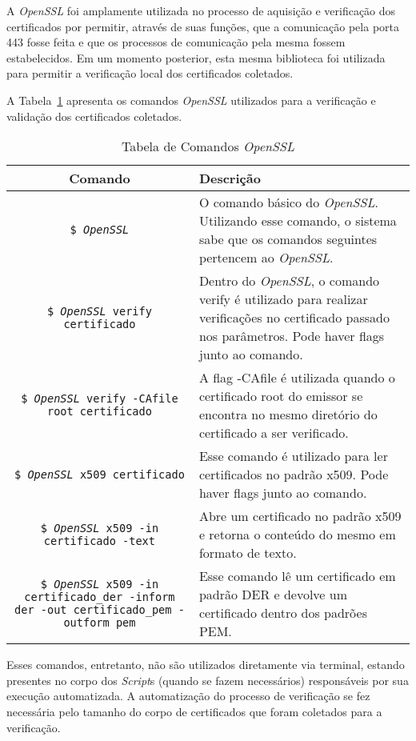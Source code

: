 		A \textit{OpenSSL} foi amplamente utilizada no processo de aquisição e verificação dos certificados por permitir, através de suas funções, que a comunicação pela porta 443  fosse feita e que os processos de comunicação pela mesma  fossem estabelecidos. Em um momento posterior, esta mesma biblioteca foi utilizada para permitir a verificação local dos certificados coletados.

		A Tabela~\ref{tab:cmds01} apresenta os comandos \textit{OpenSSL} utilizados para a verificação e validação dos certificados coletados.

		\begin{table}[h]
			\centering
			\caption{Tabela de Comandos \textit{OpenSSL}}
			\label{tab:cmds01}
			\begin{tabularx}{\linewidth}{ c X }
			\toprule
			\textbf{Comando} & \textbf{Descrição} \\ \midrule
			\texttt{\$ \textit{OpenSSL}} & O comando básico do \textit{OpenSSL}. Utilizando esse comando, o sistema sabe que os comandos seguintes pertencem ao \textit{OpenSSL}. \\ 
			\rowcolor[gray]{0.9}
			\texttt{\$ \textit{OpenSSL} verify certificado} & Dentro do \textit{OpenSSL}, o comando verify é utilizado para realizar verificações no certificado passado nos parâmetros. Pode haver flags junto ao comando. \\
			\texttt{\$ \textit{OpenSSL} verify -CAfile root certificado} & A flag -CAfile é utilizada quando o certificado root do emissor se encontra no mesmo diretório do certificado a ser verificado. \\
			\rowcolor[gray]{0.9}
			\texttt{\$ \textit{OpenSSL} x509 certificado} & Esse comando é utilizado para ler certificados no padrão x509. Pode haver flags junto ao comando. \\
			\texttt{\$ \textit{OpenSSL} x509 -in certificado -text} & Abre um certificado no padrão x509 e retorna o conteúdo do mesmo em formato de texto. \\
			\rowcolor[gray]{0.9}
			\texttt{\$ \textit{OpenSSL} x509 -in certificado\_der -inform der -out certificado\_pem -outform pem} & Esse comando lê um certificado em padrão DER e devolve um certificado dentro dos padrões PEM. \\
			\bottomrule
			\end{tabularx}
		\end{table}
		Esses comandos, entretanto, não são utilizados diretamente via terminal, estando presentes no corpo dos \textit{Script}s (quando se fazem necessários) responsáveis por sua execução automatizada. A automatização do processo de verificação se fez necessária pelo tamanho do corpo de certificados que foram coletados para a verificação.

